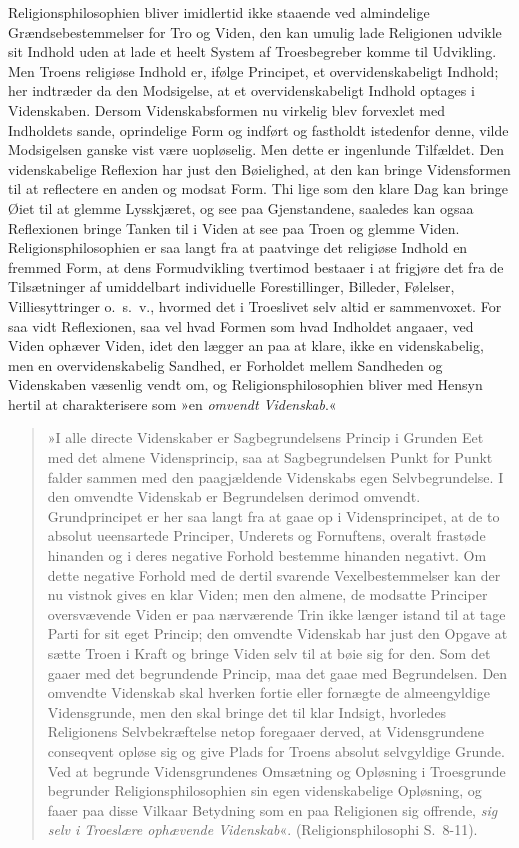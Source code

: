 \documentclass[12pt]{book}
\newcommand{\apage}[1]{\marginnote{\footnotesize\textit{[#1]}}}
\begin{document}
Religionsphilosophien bliver imidlertid ikke staaende ved almindelige
Grændsebestemmelser for Tro og Viden, den kan umulig lade Religionen udvikle
sit Indhold uden at lade et heelt System af Troesbegreber komme til Udvikling.
Men Troens religiøse Indhold er, ifølge Principet, et overvidenskabeligt
Indhold; her indtræder da den Modsigelse, at et overvidenskabeligt Indhold
optages i Videnskaben. Dersom Videnskabsformen nu virkelig blev forvexlet med
Indholdets sande, oprindelige Form og indført og fastholdt istedenfor denne,
vilde Modsigelsen ganske vist være uopløselig. Men dette er ingenlunde
Tilfældet. Den videnskabelige Reflexion har just den Bøielighed, at den kan
bringe Vidensformen til at reflectere en anden og modsat Form. Thi lige som den
klare Dag kan bringe Øiet til at glemme Lysskjæret, og see paa Gjenstandene,
saaledes kan ogsaa Reflexionen bringe Tanken til i Viden at see paa Troen og
glemme Viden. Religionsphilosophien er saa langt fra at paatvinge det religiøse
Indhold en fremmed Form, at dens Formudvikling tvertimod bestaaer i at frigjøre
det fra de Tilsætninger af umiddelbart individuelle Forestillinger, Billeder,
Følelser, Villiesyttringer o.\ s.\ v., hvormed det i Troeslivet selv altid er
sammenvoxet. For saa vidt Reflexionen, saa vel hvad Formen som hvad Indholdet
angaaer, ved Viden ophæver Viden, idet den lægger an paa at klare, ikke en
videnskabelig, men en overvidenskabelig Sandhed, er Forholdet mellem Sandheden
og \apage{280} Videnskaben væsenlig vendt om, og Religionsphilosophien bliver med Hensyn
hertil at charakterisere som »en \emph{omvendt Videnskab}.«

\begin{quote}
»I alle directe Videnskaber er Sagbegrundelsens Princip i Grunden Eet med det
almene Vidensprincip, saa at Sagbegrundelsen Punkt for Punkt falder sammen med
den paagjældende Videnskabs egen Selvbegrundelse. I den omvendte Videnskab er
Begrundelsen derimod omvendt. Grundprincipet er her saa langt fra at gaae op i
Vidensprincipet, at de to absolut ueensartede Principer, Underets og
Fornuftens, overalt frastøde hinanden og i deres negative Forhold bestemme
hinanden negativt. Om dette negative Forhold med de dertil svarende
Vexelbestemmelser kan der nu vistnok gives en klar Viden; men den almene, de
modsatte Principer oversvævende Viden er paa nærværende Trin ikke længer istand
til at tage Parti for sit eget Princip; den omvendte Videnskab har just den
Opgave at sætte Troen i Kraft og bringe Viden selv til at bøie sig for den. Som
det gaaer med det begrundende Princip, maa det gaae med Begrundelsen. Den
omvendte Videnskab skal hverken fortie eller fornægte de almeengyldige
Vidensgrunde, men den skal bringe det til klar Indsigt, hvorledes Religionens
Selvbekræftelse netop foregaaer derved, at Vidensgrundene conseqvent opløse sig
og give Plads for Troens absolut selvgyldige Grunde. Ved at begrunde
Vidensgrundenes Omsætning og Opløsning i Troesgrunde begrunder
Religionsphilosophien sin egen videnskabelige Opløsning, og faaer paa disse
Vilkaar Betydning som en paa  \apage{281} Religionen sig offrende, \emph{sig selv i Troeslære
ophævende Videnskab}«. (Religionsphilosophi S.\ 8-11).
\end{quote}
\end{document}

